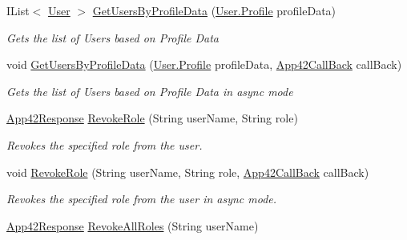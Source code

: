 \begin{DoxyCompactItemize}
I\+List$<$ \hyperlink{classcom_1_1shephertz_1_1app42_1_1paas_1_1sdk_1_1csharp_1_1user_1_1_user}{User} $>$ \hyperlink{classcom_1_1shephertz_1_1app42_1_1paas_1_1sdk_1_1csharp_1_1user_1_1_user_service_a20c07f62f43d2c16626ad43d269e517e}{Get\+Users\+By\+Profile\+Data} (\hyperlink{classcom_1_1shephertz_1_1app42_1_1paas_1_1sdk_1_1csharp_1_1user_1_1_user_1_1_profile}{User.\+Profile} profile\+Data)
\begin{DoxyCompactList}\small\item\em Gets the list of Users based on Profile Data \end{DoxyCompactList}\item 
void \hyperlink{classcom_1_1shephertz_1_1app42_1_1paas_1_1sdk_1_1csharp_1_1user_1_1_user_service_a41a70ce8506e40e06ed2021f95b8e16f}{Get\+Users\+By\+Profile\+Data} (\hyperlink{classcom_1_1shephertz_1_1app42_1_1paas_1_1sdk_1_1csharp_1_1user_1_1_user_1_1_profile}{User.\+Profile} profile\+Data, \hyperlink{interfacecom_1_1shephertz_1_1app42_1_1paas_1_1sdk_1_1csharp_1_1_app42_call_back}{App42\+Call\+Back} call\+Back)
\begin{DoxyCompactList}\small\item\em Gets the list of Users based on Profile Data in async mode \end{DoxyCompactList}\item 
\hyperlink{classcom_1_1shephertz_1_1app42_1_1paas_1_1sdk_1_1csharp_1_1_app42_response}{App42\+Response} \hyperlink{classcom_1_1shephertz_1_1app42_1_1paas_1_1sdk_1_1csharp_1_1user_1_1_user_service_a6e9975dc92e3878567a3c412c703cae5}{Revoke\+Role} (String user\+Name, String role)
\begin{DoxyCompactList}\small\item\em Revokes the specified role from the user. \end{DoxyCompactList}\item 
void \hyperlink{classcom_1_1shephertz_1_1app42_1_1paas_1_1sdk_1_1csharp_1_1user_1_1_user_service_a6690a2f18564deacaf1b3481894fa67d}{Revoke\+Role} (String user\+Name, String role, \hyperlink{interfacecom_1_1shephertz_1_1app42_1_1paas_1_1sdk_1_1csharp_1_1_app42_call_back}{App42\+Call\+Back} call\+Back)
\begin{DoxyCompactList}\small\item\em Revokes the specified role from the user in async mode. \end{DoxyCompactList}\item 
\hyperlink{classcom_1_1shephertz_1_1app42_1_1paas_1_1sdk_1_1csharp_1_1_app42_response}{App42\+Response} \hyperlink{classcom_1_1shephertz_1_1app42_1_1paas_1_1sdk_1_1csharp_1_1user_1_1_user_service_adb3f6825d83b6c3d2b0f334b9d920a10}{Revoke\+All\+Roles} (String user\+Name)

\end{DoxyCompactItemize}
